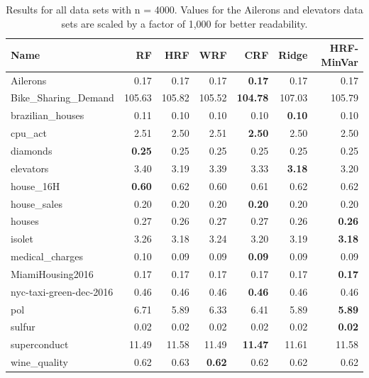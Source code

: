 \begin{table}[ht]
\centering
\begingroup\scriptsize
\begin{tabular}{lrrrrrr}
  \hline
\textbf{ Name } & \textbf{ RF } & \textbf{ HRF } & \textbf{ WRF } & \textbf{ CRF } & \textbf{ Ridge } & \textbf{ HRF-MinVar } \\ 
  \hline
Ailerons & 0.17 & 0.17 & 0.17 & \textbf{0.17} & 0.17 & 0.17 \\ 
  Bike\_Sharing\_Demand & 105.63 & 105.82 & 105.52 & \textbf{104.78} & 107.03 & 105.79 \\ 
  brazilian\_houses & 0.11 & 0.10 & 0.10 & 0.10 & \textbf{0.10} & 0.10 \\ 
  cpu\_act & 2.51 & 2.50 & 2.51 & \textbf{2.50} & 2.50 & 2.50 \\ 
  diamonds & \textbf{0.25} & 0.25 & 0.25 & 0.25 & 0.25 & 0.25 \\ 
  elevators & 3.40 & 3.19 & 3.39 & 3.33 & \textbf{3.18} & 3.20 \\ 
  house\_16H & \textbf{0.60} & 0.62 & 0.60 & 0.61 & 0.62 & 0.62 \\ 
  house\_sales & 0.20 & 0.20 & 0.20 & \textbf{0.20} & 0.20 & 0.20 \\ 
  houses & 0.27 & 0.26 & 0.27 & 0.27 & 0.26 & \textbf{0.26} \\ 
  isolet & 3.26 & 3.18 & 3.24 & 3.20 & 3.19 & \textbf{3.18} \\ 
  medical\_charges & 0.10 & 0.09 & 0.09 & \textbf{0.09} & 0.09 & 0.09 \\ 
  MiamiHousing2016 & 0.17 & 0.17 & 0.17 & 0.17 & 0.17 & \textbf{0.17} \\ 
  nyc-taxi-green-dec-2016 & 0.46 & 0.46 & 0.46 & \textbf{0.46} & 0.46 & 0.46 \\ 
  pol & 6.71 & 5.89 & 6.33 & 6.41 & 5.89 & \textbf{5.89} \\ 
  sulfur & 0.02 & 0.02 & 0.02 & 0.02 & 0.02 & \textbf{0.02} \\ 
  superconduct & 11.49 & 11.58 & 11.49 & \textbf{11.47} & 11.61 & 11.58 \\ 
  wine\_quality & 0.62 & 0.63 & \textbf{0.62} & 0.62 & 0.62 & 0.62 \\ 
   \hline
\end{tabular}
\endgroup
\caption{Results for all data sets with n = 4000. Values for the Ailerons and elevators data sets are scaled by a factor of 1,000 for better readability.} 
\end{table}
